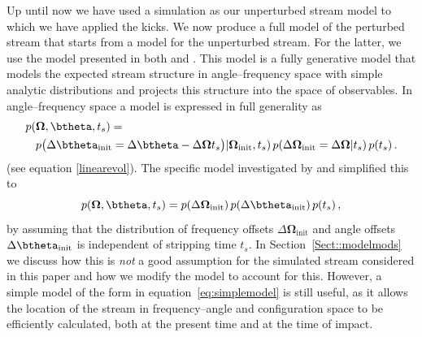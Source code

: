 \documentclass[useAMS,usenatbib,fleqn,a4paper]{mn2e}
\begin{document}
Up until now we have used a simulation as our unperturbed stream model to which we have applied the kicks. We now produce a full model of the perturbed stream that starts from a model for the unperturbed stream. For the latter, we use the model presented in both \cite{Bovy2014} and \cite{Sanders2014}. This model is a fully generative model that models the expected stream structure in angle--frequency space with simple analytic distributions and projects this structure into the space of observables. In angle--frequency space a model is expressed in full generality as
\begin{equation}
\begin{split}
p(&\boldsymbol{\Omega},\btheta,t_s) =\\
 & p\big(\Delta\btheta_\mathrm{init}=\Delta\btheta-\Delta\boldsymbol{\Omega}t_s\big)|\boldsymbol{\Omega}_\mathrm{init},t_s)\,p(\Delta\boldsymbol{\Omega}_\mathrm{init}=\Delta\boldsymbol{\Omega}|t_s)\,p(t_s)\,.
\end{split}
\end{equation}
(see equation \eqref{linearevol}). The specific model investigated by \cite{Bovy2014} and \cite{Sanders2014} simplified this to
\begin{equation}\label{eq:simplemodel}
p(\boldsymbol{\Omega},\btheta,t_s) = p(\Delta\boldsymbol{\Omega}_\mathrm{init})\, p(\Delta\btheta_\mathrm{init})\,p(t_s)\,,
\end{equation}
by assuming that the distribution of frequency offsets $\Delta\boldsymbol{\Omega}_\mathrm{init}$ and angle offsets $\Delta\btheta_\mathrm{init}$ is independent of stripping time $t_s$. In Section~\ref{Sect::modelmods} we discuss how this is \emph{not} a good assumption for the simulated stream considered in this paper and how we modify the model to account for this. However, a simple model of the form in equation~\eqref{eq:simplemodel} is still useful, as it allows the location of the stream in frequency--angle and configuration space to be efficiently calculated, both at the present time and at the time of impact.
\end{document}
